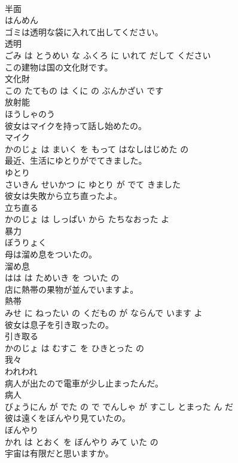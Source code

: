 \documentclass[8pt]{extreport}
\begin{document}
\begin{CJK}{UTF8}{min}
\\	半面	
\\	はんめん		
\\	ゴミは透明な袋に入れて出してください。	
\\	透明 
\\	ごみ は とうめい な ふくろ に いれて だして ください			
\\	この建物は国の文化財です。	
\\	文化財 
\\	この たてもの は くに の ぶんかざい です			
\\	放射能	
\\	ほうしゃのう		
\\	彼女はマイクを持って話し始めたの。	
\\	マイク 
\\	かのじょ は まいく を もって はなしはじめた の			
\\	最近、生活にゆとりがでてきました。	
\\	ゆとり 
\\	さいきん せいかつ に ゆとり が でて きました			
\\	彼女は失敗から立ち直ったよ。	
\\	立ち直る 
\\	かのじょ は しっぱい から たちなおった よ			
\\	暴力	
\\	ぼうりょく		
\\	母は溜め息をついたの。	
\\	溜め息 
\\	はは は ためいき を ついた の			
\\	店に熱帯の果物が並んでいますよ。	
\\	熱帯 
\\	みせ に ねったい の くだもの が ならんで います よ			
\\	彼女は息子を引き取ったの。	
\\	引き取る 
\\	かのじょ は むすこ を ひきとった の			
\\	我々	
\\	われわれ		
\\	病人が出たので電車が少し止まったんだ。	
\\	病人 
\\	びょうにん が でた の で でんしゃ が すこし とまった ん だ			
\\	彼は遠くをぼんやり見ていたの。	
\\	ぼんやり 
\\	かれ は とおく を ぼんやり みて いた の			
\\	宇宙は有限だと思いますか。	

\end{CJK}
\end{document}
